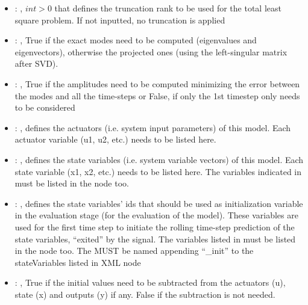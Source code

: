 \begin{itemize}
    \item {}: ,
      $int > 0$ that defines the truncation rank to be used for the total
      least square problem. If not inputted, no truncation is applied

    \item {}: ,
      True if the exact modes need to be computed (eigenvalues and
      eigenvectors),   otherwise the projected ones (using the left-singular matrix after SVD).

    \item {}: ,
      True if the amplitudes need to be computed minimizing the error
      between the modes and all the time-steps or False, if only the 1st timestep only needs to be
      considered

    \item {}: ,
      defines the actuators (i.e. system input parameters)
      of this model. Each actuator variable (u1, u2, etc.) needs to
      be listed here.

    \item {}: ,
      defines the state variables (i.e. system variable vectors)
      of this model. Each state variable (x1, x2, etc.) needs to be listed
      here. The variables indicated in  must be
      listed in the  node too.

    \item {}: ,
      defines the state variables' ids  that should be used as
      initialization variable                                                   in the evaluation
      stage (for the evaluation of the model).
      These variables are used for the first time step to initiate
      the rolling time-step prediction of the state variables, ``exited''
      by the  signal. The variables listed in
       must be listed in the  
      node too.                                                   \nb The
       MUST be named appending ``\_init'' to
      the stateVariables listed in  XML node

    \item {}: ,
      True if the initial values need to be subtracted from the
      actuators (u), state (x) and outputs (y) if any. False if the subtraction
      is not needed.


\end{itemize}
